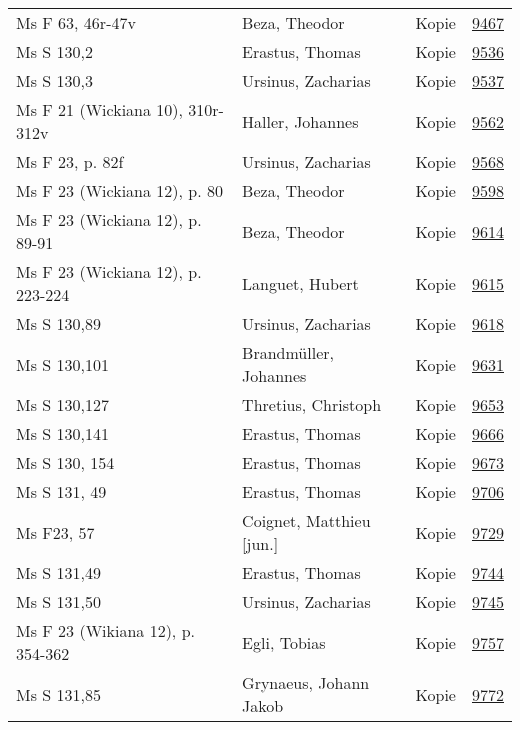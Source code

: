 \documentclass[10pt,a4paper,landscape]{report}
\begin{document}
\begin{longtable}{p{16cm}p{4cm}lr}
Ms F 63, 46r-47v	&	Beza, Theodor	&	Kopie	&	\href{http://130.60.24.72/assignment/9467}{9467}\\
Ms S 130,2	&	Erastus, Thomas	&	Kopie	&	\href{http://130.60.24.72/assignment/9536}{9536}\\
Ms S 130,3	&	Ursinus, Zacharias	&	Kopie	&	\href{http://130.60.24.72/assignment/9537}{9537}\\
Ms F 21 (Wickiana 10), 310r-312v	&	Haller, Johannes	&	Kopie	&	\href{http://130.60.24.72/assignment/9562}{9562}\\
Ms F 23, p. 82f	&	Ursinus, Zacharias	&	Kopie	&	\href{http://130.60.24.72/assignment/9568}{9568}\\
Ms F 23 (Wickiana 12), p. 80	&	Beza, Theodor	&	Kopie	&	\href{http://130.60.24.72/assignment/9598}{9598}\\
Ms F 23 (Wickiana 12), p. 89-91	&	Beza, Theodor	&	Kopie	&	\href{http://130.60.24.72/assignment/9614}{9614}\\
Ms F 23 (Wickiana 12), p. 223-224	&	Languet, Hubert	&	Kopie	&	\href{http://130.60.24.72/assignment/9615}{9615}\\
Ms S 130,89	&	Ursinus, Zacharias	&	Kopie	&	\href{http://130.60.24.72/assignment/9618}{9618}\\
Ms S 130,101	&	Brandmüller, Johannes	&	Kopie	&	\href{http://130.60.24.72/assignment/9631}{9631}\\
Ms S 130,127	&	Thretius, Christoph	&	Kopie	&	\href{http://130.60.24.72/assignment/9653}{9653}\\
Ms S 130,141	&	Erastus, Thomas	&	Kopie	&	\href{http://130.60.24.72/assignment/9666}{9666}\\
Ms S 130, 154	&	Erastus, Thomas	&	Kopie	&	\href{http://130.60.24.72/assignment/9673}{9673}\\
Ms S 131, 49	&	Erastus, Thomas	&	Kopie	&	\href{http://130.60.24.72/assignment/9706}{9706}\\
Ms F23, 57	&	Coignet, Matthieu [jun.]	&	Kopie	&	\href{http://130.60.24.72/assignment/9729}{9729}\\
Ms S 131,49	&	Erastus, Thomas	&	Kopie	&	\href{http://130.60.24.72/assignment/9744}{9744}\\
Ms S 131,50	&	Ursinus, Zacharias	&	Kopie	&	\href{http://130.60.24.72/assignment/9745}{9745}\\
Ms F 23 (Wikiana 12), p. 354-362	&	Egli, Tobias	&	Kopie	&	\href{http://130.60.24.72/assignment/9757}{9757}\\
Ms S 131,85	&	Grynaeus, Johann Jakob	&	Kopie	&	\href{http://130.60.24.72/assignment/9772}{9772}\\

\end{longtable}
\end{document}
